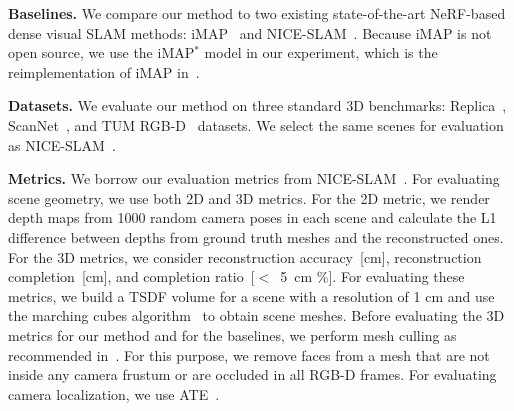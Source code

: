 \vspace{1ex}
\noindent\textbf{Baselines.} We compare our method to two existing state-of-the-art NeRF-based dense visual SLAM methods: iMAP~\cite{sucar2021imap} and NICE-SLAM~\cite{zhu2022nice}. Because iMAP is not open source, we use the iMAP$^*$ model in our experiment, which is the reimplementation of iMAP in~\cite{zhu2022nice}.

\vspace{1ex}
\noindent\textbf{Datasets.} We evaluate our method on three standard 3D benchmarks: Replica~\cite{replica19arxiv}, ScanNet~\cite{dai2017scannet}, and TUM RGB-D~\cite{sturm2012benchmark} datasets. We select the same scenes for evaluation as NICE-SLAM~\cite{zhu2022nice}.

\vspace{1ex}
\noindent\textbf{Metrics.} We borrow our evaluation metrics from NICE-SLAM~\cite{zhu2022nice}. For evaluating scene geometry, we use both 2D and 3D metrics. For the 2D metric, we render depth maps from 1000 random camera poses in each scene and calculate the L1 difference between depths from ground truth meshes and the reconstructed ones. For the 3D metrics, we consider reconstruction accuracy~[cm], reconstruction completion~[cm], and completion ratio~[$<$~5~cm \%]. For evaluating these metrics, we build a TSDF volume for a scene with a resolution of 1 cm and use the marching cubes algorithm~\cite{lorensen1987marching} to obtain scene meshes. Before evaluating the 3D metrics for our method and for the baselines, we perform mesh culling as recommended in~\cite{azinovic2022neural, wang2022go}. For this purpose, we remove faces from a mesh that are not inside any camera frustum or are occluded in all RGB-D frames. For evaluating camera localization, we use ATE~\cite{sturm2012benchmark}.

